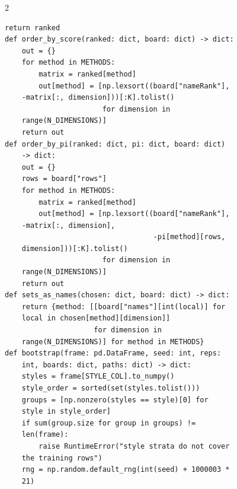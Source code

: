 \begin{multicols}{2}
\begin{Verbatim}[fontsize=\scriptsize]
    return ranked
def order_by_score(ranked: dict, board: dict) -> dict:
    out = {}
    for method in METHODS:
        matrix = ranked[method]
        out[method] = [np.lexsort((board["nameRank"],
    -matrix[:, dimension]))[:K].tolist()
                       for dimension in
    range(N_DIMENSIONS)]
    return out
def order_by_pi(ranked: dict, pi: dict, board: dict)
    -> dict:
    out = {}
    rows = board["rows"]
    for method in METHODS:
        matrix = ranked[method]
        out[method] = [np.lexsort((board["nameRank"],
    -matrix[:, dimension],
                                   -pi[method][rows,
    dimension]))[:K].tolist()
                       for dimension in
    range(N_DIMENSIONS)]
    return out
def sets_as_names(chosen: dict, board: dict) -> dict:
    return {method: [[board["names"][int(local)] for
    local in chosen[method][dimension]]
                     for dimension in
    range(N_DIMENSIONS)] for method in METHODS}
def bootstrap(frame: pd.DataFrame, seed: int, reps:
    int, boards: dict, paths: dict) -> dict:
    styles = frame[STYLE_COL].to_numpy()
    style_order = sorted(set(styles.tolist()))
    groups = [np.nonzero(styles == style)[0] for
    style in style_order]
    if sum(group.size for group in groups) !=
    len(frame):
        raise RuntimeError("style strata do not cover
    the training rows")
    rng = np.random.default_rng(int(seed) + 1000003 *
    21)


\end{Verbatim}
\end{multicols}
